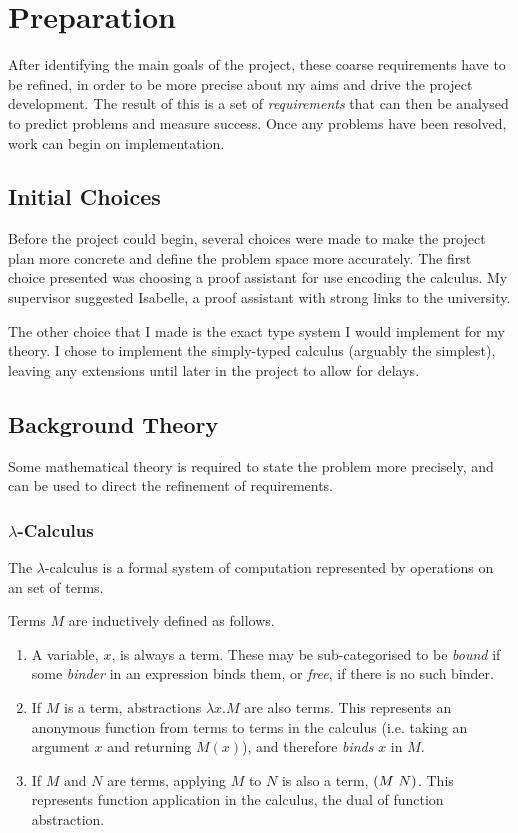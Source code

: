 \chapter{Preparation}
After identifying the main goals of the project, these coarse requirements have to be refined, in order to be more precise about my aims and drive the project development.
The result of this is a set of \emph{requirements} that can then be analysed to predict problems and measure success.
Once any problems have been resolved, work can begin on implementation.

\section{Initial Choices}
Before the project could begin, several choices were made to make the project plan more concrete and define the problem space more accurately.
The first choice presented was choosing a proof assistant for use encoding the calculus.
My supervisor suggested Isabelle\cite{isabelle}, a proof assistant with strong links to the university.

The other choice that I made is the exact type system I would implement for my theory.
I chose to implement the simply-typed calculus (arguably the simplest), leaving any extensions until later in the project to allow for delays.

\section{Background Theory}
Some mathematical theory is required to state the problem more precisely, and can be used to direct the refinement of requirements.

\subsection{\(\lambda\)-Calculus}
The \(\lambda\)-calculus\cite{lambda-overview} is a formal system of computation represented by operations on an set of terms.
\begin{definition}
Terms \(M\) are inductively defined as follows.
\begin{enumerate}
\item
A variable, \(x\), is always a term.
These may be sub-categorised to be \emph{bound} if some \emph{binder} in an expression binds them, or \emph{free}, if there is no such binder.
\item
If \(M\) is a term, abstractions \(\lambda x.M\) are also terms.
This represents an anonymous function from terms to terms in the calculus (i.e. taking an argument \(x\) and returning \(M(x)\)), and therefore \emph{binds} \(x\) in \(M\).
\item
If \(M\) and \(N\) are terms, applying \(M\) to \(N\) is also a term, \(\left(M\ N\right)\).
This represents function application in the calculus, the dual of function abstraction.
\end{enumerate}
\end{definition}

